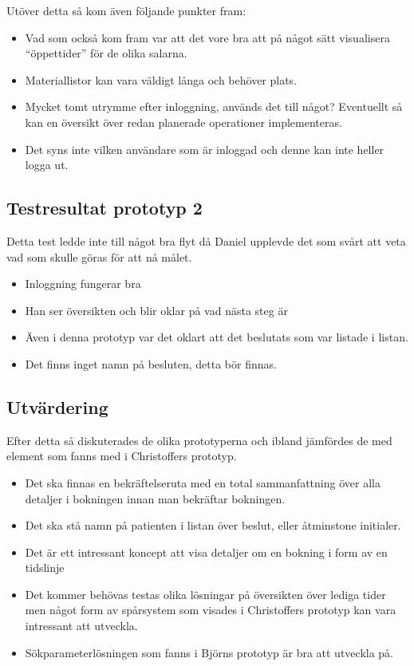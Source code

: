 Utöver detta så kom även följande punkter fram:
\begin{itemize}
\item Vad som också kom fram var att det vore bra att på något sätt visualisera “öppettider” för de olika salarna.
\item Materiallistor kan vara väldigt långa och behöver plats.
\item Mycket tomt utrymme efter inloggning, används det till något? Eventuellt så kan en översikt över redan planerade operationer implementeras.
\item Det syns inte vilken användare som är inloggad och denne kan inte heller logga ut.
\end{itemize}
\subsection{Testresultat prototyp 2}
Detta test ledde inte till något bra flyt då Daniel upplevde det som svårt att veta vad som skulle göras för att nå målet.
\begin{itemize}
\item Inloggning fungerar bra
\item Han ser översikten och blir oklar på vad nästa steg är
\item Även i denna prototyp var det oklart att det beslutats som var listade i listan.
\item Det finns inget namn på besluten, detta bör finnas.
\end{itemize}

\subsection{Utvärdering}
Efter detta så diskuterades de olika prototyperna och ibland jämfördes de med element som fanns med i Christoffers prototyp.

\begin{itemize}
\item Det ska finnas en bekräftelseruta med en total sammanfattning över alla detaljer i bokningen innan man bekräftar bokningen.
\item Det ska stå namn på patienten i listan över beslut, eller åtminstone initialer.
\item Det är ett intressant koncept att visa detaljer om en bokning i form av en tidslinje
\item Det kommer behövas testas olika lösningar på översikten över lediga tider men något form av spårsystem som visades i Christoffers prototyp kan vara intressant att utveckla.
\item Sökparameterlösningen som fanns i Björns prototyp är bra att utveckla på.
\end{itemize}
